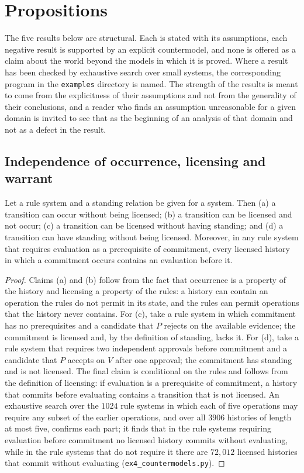 \section{Propositions}

The five results below are structural. Each is stated with its assumptions, each negative result is supported by an explicit countermodel, and none is offered as a claim about the world beyond the models in which it is proved. Where a result has been checked by exhaustive search over small systems, the corresponding program in the \texttt{examples} directory is named. The strength of the results is meant to come from the explicitness of their assumptions and not from the generality of their conclusions, and a reader who finds an assumption unreasonable for a given domain is invited to see that as the beginning of an analysis of that domain and not as a defect in the result.

\subsection*{Independence of occurrence, licensing and warrant}

\begin{proposition}\label{prop:one}
Let a rule system and a standing relation be given for a system. Then (a) a transition can occur without being licensed; (b) a transition can be licensed and not occur; (c) a transition can be licensed without having standing; and (d) a transition can have standing without being licensed. Moreover, in any rule system that requires evaluation as a prerequisite of commitment, every licensed history in which a commitment occurs contains an evaluation before it.
\end{proposition}

\begin{proof}
Claims (a) and (b) follow from the fact that occurrence is a property of the history and licensing a property of the rules: a history can contain an operation the rules do not permit in its state, and the rules can permit operations that the history never contains. For (c), take a rule system in which commitment has no prerequisites and a candidate that $P$ rejects on the available evidence; the commitment is licensed and, by the definition of standing, lacks it. For (d), take a rule system that requires two independent approvals before commitment and a candidate that $P$ accepts on $V$ after one approval; the commitment has standing and is not licensed. The final claim is conditional on the rules and follows from the definition of licensing: if evaluation is a prerequisite of commitment, a history that commits before evaluating contains a transition that is not licensed. An exhaustive search over the $1024$ rule systems in which each of five operations may require any subset of the earlier operations, and over all $3906$ histories of length at most five, confirms each part; it finds that in the rule systems requiring evaluation before commitment no licensed history commits without evaluating, while in the rule systems that do not require it there are $72{,}012$ licensed histories that commit without evaluating (\texttt{ex4\_countermodels.py}).
\end{proof}

